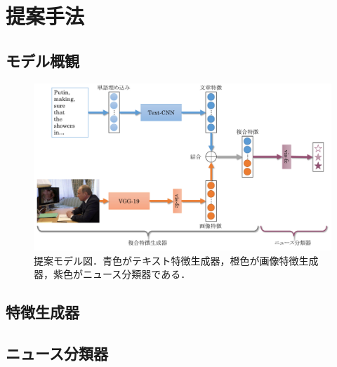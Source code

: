 %
\chapter{提案手法}
%
\section{モデル概観}
% 
\begin{figure}
    \centering
    \includegraphics[width=\linewidth]{images/methodology.pdf}
    \caption{提案モデル図．青色がテキスト特徴生成器，橙色が画像特徴生成器，紫色がニュース分類器である．}
    \label{fig:model}
\end{figure}

%
\section{特徴生成器}
%

%
\section{ニュース分類器}
%




%
%
\newpage
%
%
%
%
%
%
%
%
%
%
% 